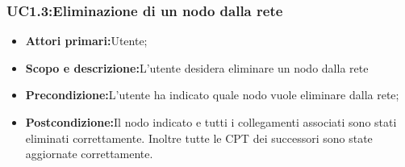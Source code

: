 \subsubsection{UC1.3:Eliminazione di un nodo dalla rete}
\begin{itemize}
	\item{\textbf{Attori primari:}Utente;}
	\item{\textbf{Scopo e descrizione:}L'utente desidera eliminare un nodo dalla rete}
	\item{\textbf{Precondizione:}L'utente ha indicato quale nodo vuole eliminare dalla rete;}
	\item{\textbf{Postcondizione:}Il nodo indicato e tutti i collegamenti associati sono stati eliminati correttamente. Inoltre tutte le CPT dei successori sono state aggiornate correttamente.}
\end{itemize}
